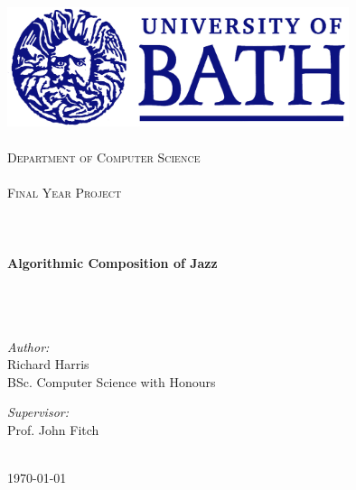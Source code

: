 \begin{titlepage}
\begin{center}
%
\includegraphics[width=100mm]{blulogo.jpg}\\
%
\ \\ %
\textsc{\Large
%
Department of Computer Science\\
\ \\
Final Year Project\\
\ \\}
\ \\
\ \\
%
%
{\huge \bfseries
Algorithmic Composition of Jazz
}
\ \\
\ \\
\ \\
\ \\
\begin{minipage}{0.4\textwidth}
\begin{flushleft} \large
\emph{Author:}\\
Richard Harris\\
\footnotesize{BSc. Computer Science with Honours}
\end{flushleft}
\end{minipage}
%
\begin{minipage}{0.4\textwidth}
\begin{flushright} \large
\emph{Supervisor:} \\
Prof. John Fitch\\
\footnotesize{\ }
\end{flushright}
\end{minipage}
%
\vfill %
%
{\large \today}
%
\end{center}
\end{titlepage}
\newpage